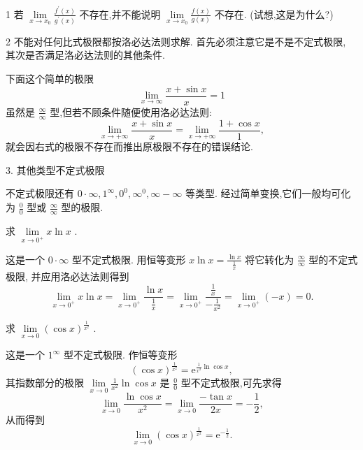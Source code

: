 \begin{remark}
1 若 \(\mathop{\lim }\limits_{{x \rightarrow  {x}_{0}}}\frac{{f}^{\prime }\left( x\right) }{{g}^{\prime }\left( x\right) }\) 不存在,并不能说明 \(\mathop{\lim }\limits_{{x \rightarrow  {x}_{0}}}\frac{f\left( x\right) }{g\left( x\right) }\) 不存在. (试想,这是为什么?)

\end{remark}

\begin{remark}
2 不能对任何比式极限都按洛必达法则求解. 首先必须注意它是不是不定式极限, 其次是否满足洛必达法则的其他条件.
\end{remark}

下面这个简单的极限
\[
\mathop{\lim }\limits_{{x \rightarrow  \infty }}\frac{x + \sin x}{x} = 1
\]
虽然是 \(\frac{\infty }{\infty }\) 型,但若不顾条件随便使用洛必达法则:
\[
\mathop{\lim }\limits_{{x \rightarrow   + \infty }}\frac{x + \sin x}{x} = \mathop{\lim }\limits_{{x \rightarrow   + \infty }}\frac{1 + \cos x}{1},
\]
就会因右式的极限不存在而推出原极限不存在的错误结论.

3. 其他类型不定式极限

不定式极限还有 \(0 \cdot  \infty ,{1}^{\infty },{0}^{0},{\infty }^{0},\infty  - \infty\) 等类型. 经过简单变换,它们一般均可化为 \(\frac{0}{0}\) 型或 \(\frac{\infty }{\infty }\) 型的极限.

\begin{example}
求 \(\mathop{\lim }\limits_{{x \rightarrow  {0}^{ + }}}x\ln x\) .
\end{example}


\begin{solution}
这是一个 \(0 \cdot  \infty\) 型不定式极限. 用恒等变形 \(x\ln x = \frac{\ln x}{\frac{1}{x}}\) 将它转化为 \(\frac{\infty }{\infty }\) 型的不定式极限, 并应用洛必达法则得到
\[
\mathop{\lim }\limits_{{x \rightarrow  {0}^{ + }}}x\ln x = \mathop{\lim }\limits_{{x \rightarrow  {0}^{ + }}}\frac{\ln x}{\frac{1}{x}} = \mathop{\lim }\limits_{{x \rightarrow  {0}^{ + }}}\frac{\frac{1}{x}}{-\frac{1}{{x}^{2}}} = \mathop{\lim }\limits_{{x \rightarrow  {0}^{ + }}}\left( {-x}\right)  = 0.
\]
\end{solution}

\begin{example}
求 \(\mathop{\lim }\limits_{{x \rightarrow  0}}{\left( \cos x\right) }^{\frac{1}{{x}^{2}}}\) .
\end{example}


\begin{solution}
这是一个 \({1}^{\infty }\) 型不定式极限. 作恒等变形
\[
{\left( \cos x\right) }^{\frac{1}{{x}^{2}}} = {\mathrm{e}}^{\frac{1}{{x}^{2}}\ln \cos x},
\]
其指数部分的极限 \(\mathop{\lim }\limits_{{x \rightarrow  0}}\frac{1}{{x}^{2}}\ln \cos x\) 是 \(\frac{0}{0}\) 型不定式极限,可先求得
\[
\mathop{\lim }\limits_{{x \rightarrow  0}}\frac{\ln \cos x}{{x}^{2}} = \mathop{\lim }\limits_{{x \rightarrow  0}}\frac{-\tan x}{2x} =  - \frac{1}{2},
\]
从而得到
\[
\mathop{\lim }\limits_{{x \rightarrow  0}}{\left( \cos x\right) }^{\frac{1}{{x}^{2}}} = {\mathrm{e}}^{-\frac{1}{2}}.
\]
\end{solution}

